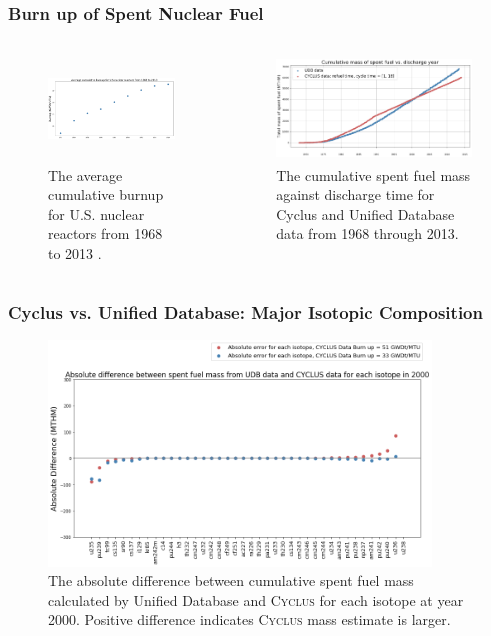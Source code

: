 \begin{frame}
    \frametitle{Burn up of Spent Nuclear Fuel}
    \begin{columns}
        \column[t]{5cm}
        \begin{figure}[htbp!]
        \begin{center}
        \includegraphics[height=2.8cm]{../figures/burn_up_real}
        \end{center}
        \caption{The average cumulative burnup for U.S. nuclear reactors
        from 1968 to 2013 \cite{eia_spent_2015}.}
        \end{figure}
        \column[t]{5cm}
        \begin{figure}[htbp!]
            \begin{center}
            \includegraphics[height=2.8cm]{../figures/cumulative_mass_udb_cyclus}
            \end{center}
                \caption{The cumulative spent fuel mass against discharge time
                for Cyclus and Unified Database data from 1968 through 2013.}
          \label{fig:totalmass}
            \end{figure}
    \end{columns}
\end{frame}

\begin{frame}
    \frametitle{Cyclus vs. Unified Database: Major Isotopic Composition}
    \begin{figure}[htbp!]
        \begin{center}
          \includegraphics[height=6cm]{../figures/absolute_diff_2000}
        \end{center}
              \caption{The absolute difference between cumulative spent fuel mass calculated by 
              Unified Database and \textsc{Cyclus} for each isotope at year 2000. Positive difference indicates \textsc{Cyclus}
              mass estimate is larger.}
        \label{fig:totalmass}
      \end{figure}
\end{frame}

